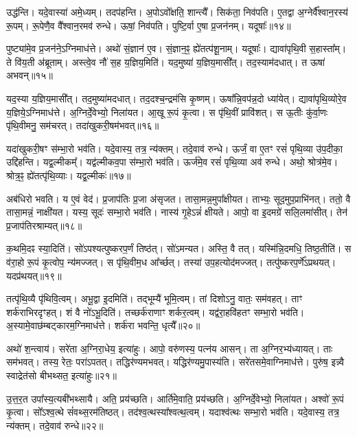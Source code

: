 उद्ध॑न्ति।
यदे॒वास्या॑ अमे॒ध्यम्।
तदप॑हन्ति।
अ॒पोऽवो᳚क्षति॒ शान्त्यै᳚।
सिक॑ता॒ निव॑पति।
ए॒तद्वा अ॒ग्नेर्वै᳚श्वान॒रस्य॑ रू॒पम्।
रू॒पेणै॒व वै᳚श्वान॒रमव॑ रुन्धे।
ऊषां॒ निव॑पति।
पुष्टि॒र्वा ए॒षा प्र॒जन॑नम्।
यदूषाः᳚॥१४॥\ip

पुष्ट्या॑मे॒व प्र॒जन॑ने॒\-ऽग्निमाध॑त्ते।
अथो॑ सं॒ज्ञान॑ ए॒व।
सं॒ज्ञान॒ꣴ॒ ह्ये॑तत्प॑शू॒नाम्।
यदूषाः᳚।
द्यावा॑पृथि॒वी स॒हास्ता᳚म्।
ते वि॑य॒ती अ॑ब्रूताम्।
अस्त्वे॒व नौ॑ स॒ह य॒ज्ञिय॒मिति॑।
यद॒मुष्या॑ य॒ज्ञिय॒मासी᳚त्।
तद॒स्याम॑दधात्।
त ऊषा॑ अभवन्॥१५॥\ip

यद॒स्या य॒ज्ञिय॒मासी᳚त्।
तद॒मुष्या॑मदधात्।
तद॒दश्च॒न्द्रम॑सि कृ॒ष्णम्।
ऊषा᳚न्नि॒वप॑न्न॒दो ध्या॑येत्।
द्यावा॑पृथि॒व्योरे॒व य॒ज्ञिये॒\-ऽग्निमाध॑त्ते।
अ॒ग्निर्दे॒वेभ्यो॒ निला॑यत।
आ॒खू रू॒पं कृ॒त्वा।
स पृ॑थि॒वीं प्रावि॑शत्।
स ऊ॒तीः कु॑र्वा॒णः पृ॑थि॒वीमनु॒ सम॑चरत्।
तदा॑खुकरी॒षम॑भवत्॥१६॥\ip

यदा॑खुकरी॒षꣳ स॑म्भा॒रो भव॑ति।
यदे॒वास्य॒ तत्र॒ न्य॑क्तम्।
तदे॒वाव॑ रुन्धे।
ऊर्जं॒ वा ए॒तꣳ रसं॑ पृथि॒व्या उ॑प॒दीका॒ उद्दि॑हन्ति।
यद्व॒ल्मीकम्᳚।
यद्व॑ल्मीकव॒पा स॑म्भा॒रो भव॑ति।
ऊर्ज॑मे॒व रसं॑ पृथि॒व्या अव॑ रुन्धे।
अथो॒ श्रोत्र॑मे॒व।
श्रोत्र॒ꣴ॒ ह्ये॑तत्पृ॑थि॒व्याः।
यद्व॒ल्मीकः॑॥१७॥\ip

अब॑धिरो भवति।
य ए॒वं वेद॑।
प्र॒जा\-प॑तिः प्र॒जा अ॑\-सृजत।
तासा॒मन्न॒मुपा᳚क्षीयत।
ताभ्यः॒ सूद॒मुप॒प्राभि॑नत्।
ततो॒ वै तासा॒मन्नं॒ नाक्षी॑यत।
यस्य॒ सूदः॑ सम्भा॒रो भव॑ति।
नास्य॑ गृ॒हेऽन्नं॑ क्षीयते।
आपो॒ वा इ॒दमग्रे॑ सलि॒लमा॑सीत्।
तेन॑ प्र॒जा\-प॑तिरश्राम्यत्॥१८॥\ip

क॒थमि॒दꣴ स्या॒दिति॑।
सो॑ऽपश्यत्पुष्करप॒र्णं तिष्ठ॑त्।
सो॑ऽमन्यत।
अस्ति॒ वै तत्।
यस्मि॑न्नि॒दमधि॒ तिष्ठ॒तीति॑।
स व॑रा॒हो रू॒पं कृ॒त्वोप॒ न्य॑मज्जत्।
स पृ॑थि॒वीम॒ध आ᳚र्च्छत्।
तस्या॑ उप॒हत्योद॑मज्जत्।
तत्पु॑ष्करप॒र्णे᳚\-ऽप्रथयत्।
यदप्र॑थयत्॥१९॥\ip

तत्पृ॑थि॒व्यै पृ॑थिवि॒त्वम्।
अभू॒द्वा इ॒दमिति॑।
तद्भूम्यै॑ भूमि॒त्वम्।
तां दिशोऽनु॒ वातः॒ सम॑वहत्।
ताꣳ शर्क॑राभिरदृꣳहत्।
शं वै नो॑ऽभू॒दिति॑।
तच्छर्क॑राणाꣳ शर्कर॒त्वम्।
यद्व॑रा॒हवि॑हतꣳ सम्भा॒रो भव॑ति।
अ॒स्यामे॒वा\-छ॑म्बट्कारम॒ग्निमाध॑त्ते।
शर्क॑रा भवन्ति॒ धृत्यै᳚॥२०॥\ip

अथो॑ श॒न्त्वाय॑।
सरे॑ता अ॒ग्निरा॒धेय॒ इत्या॑हुः।
आपो॒ वरु॑णस्य॒ पत्न॑य आसन्।
ता अ॒ग्निर॒भ्य॑ध्यायत्।
ताः सम॑भवत्।
तस्य॒ रेतः॒ परा॑ऽपतत्।
तद्धिर॑ण्यमभवत्।
यद्धिर॑ण्यमु॒पास्य॑ति।
सरे॑तसमे॒वाग्निमाध॑त्ते।
पुरु॑ष॒ इन्न्वै स्वाद्रेत॑सो बीभथ्सत॒ इत्या॑हुः॥२१॥\ip

उ॒त्त॒र॒त उपा᳚स्य॒त्यबी॑भथ्सायै।
अति॒ प्रय॑च्छति।
आर्ति॑मे॒वाति॒ प्रय॑च्छति।
अ॒ग्निर्दे॒वेभ्यो॒ निला॑यत।
अश्वो॑ रू॒पं कृ॒त्वा।
सो᳚ऽश्व॒त्थे सं॑वथ्स॒रम॑तिष्ठत्।
तद॑श्व॒त्थस्या᳚श्वत्थ॒त्वम्।
यदाश्व॑त्थः सम्भा॒रो भव॑ति।
यदे॒वास्य॒ तत्र॒ न्य॑क्तम्।
तदे॒वाव॑ रुन्धे॥२२॥\ip

